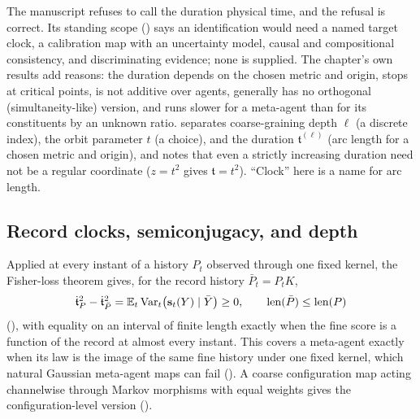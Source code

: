 The manuscript refuses to call the duration physical time, and the refusal is correct. Its standing
scope () says an identification would need a named target clock, a
calibration map with an uncertainty model, causal and compositional consistency, and discriminating
evidence; none is supplied. The chapter's own results add reasons: the duration depends on the chosen
metric and origin, stops at critical points, is not additive over agents, generally has no orthogonal
(simultaneity-like) version, and runs slower for a meta-agent than for its constituents by an unknown
ratio.  separates coarse-graining depth $\ell$ (a discrete
index), the orbit parameter $t$ (a choice), and the duration $\mathfrak t^{(\ell)}$ (arc length for a
chosen metric and origin), and notes that even a strictly increasing duration need not be a regular
coordinate ($z=t^2$ gives $\mathfrak t=t^2$). ``Clock'' here is a name for arc length.

\subsection{Record clocks, semiconjugacy, and depth}
\label{comp:ch07-formulas-semiconjugacy}

Applied at every instant of a history $P_t$ observed through one fixed kernel, the Fisher-loss theorem
gives, for the record history $\bar P_t=P_tK$,
\[
\dot{\mathfrak t}_P^2-\dot{\mathfrak t}_{\bar P}^2
=\mathbb E_t\operatorname{Var}_t\bigl(\mathbf s_t(Y)\mid\bar Y\bigr)\geq0,
\qquad
\operatorname{len}(\bar P)\leq\operatorname{len}(P)
\]
(), with equality on an interval of finite length exactly when
the fine score is a function of the record at almost every instant. This covers a meta-agent exactly
when its law is the image of the same fine history under one fixed kernel, which natural Gaussian
meta-agent maps can fail (). A coarse configuration map acting
channelwise through Markov morphisms with equal weights gives the configuration-level version
().

